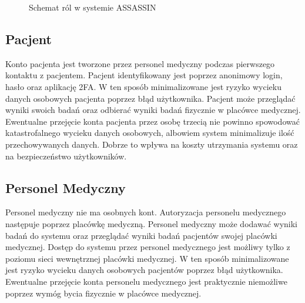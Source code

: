 \documentclass{documentation}
\begin{document}
\begin{figure}[h!]
    \centering
    \caption{Schemat ról w systemie ASSASSIN\label{fig:roles}}
\end{figure}

\subsection{Pacjent}

Konto pacjenta jest tworzone przez personel medyczny podczas pierwszego kontaktu z pacjentem.
Pacjent identyfikowany jest poprzez anonimowy login, hasło oraz aplikację 2FA.
W ten sposób minimalizowane jest ryzyko wycieku danych osobowych pacjenta poprzez błąd użytkownika.
Pacjent może przeglądać wyniki swoich badań oraz odbierać wyniki badań fizycznie w placówce medycznej.
Ewentualne przejęcie konta pacjenta przez osobę trzecią nie powinno spowodować katastrofalnego wycieku danych osobowych, albowiem system minimalizuje ilość przechowywanych danych.
Dobrze to wpływa na koszty utrzymania systemu oraz na bezpieczeństwo użytkowników.

\subsection{Personel Medyczny}

Personel medyczny nie ma osobnych kont.
Autoryzacja personelu medycznego następuje poprzez placówkę medyczną.
Personel medyczny może dodawać wyniki badań do systemu oraz przeglądać wyniki badań pacjentów swojej placówki medycznej.
Dostęp do systemu przez personel medycznego jest możliwy tylko z poziomu sieci wewnętrznej placówki medycznej.
W ten sposób minimalizowane jest ryzyko wycieku danych osobowych pacjentów poprzez błąd użytkownika.
Ewentualne przejęcie konta personelu medycznego jest praktycznie niemożliwe poprzez wymóg bycia fizycznie w placówce medycznej.
\end{document}
